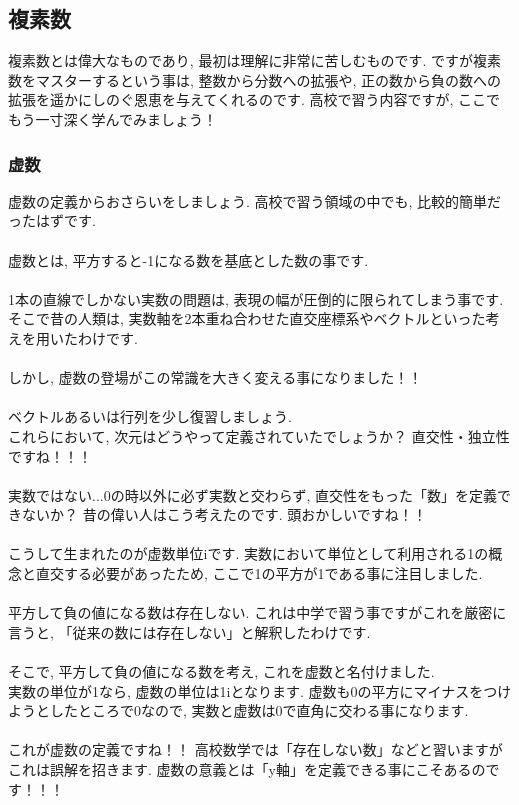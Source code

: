 \documentclass[11pt,a4paper]{jsarticle}
\begin{document}
\subsection{複素数}
複素数とは偉大なものであり, 最初は理解に非常に苦しむものです. ですが複素数をマスターするという事は, 整数から分数への拡張や, 正の数から負の数への拡張を遥かにしのぐ恩恵を与えてくれるのです. 高校で習う内容ですが, ここでもう一寸深く学んでみましょう！\\
\subsubsection{虚数}
虚数の定義からおさらいをしましょう. 高校で習う領域の中でも, 比較的簡単だったはずです.\\
\\
虚数とは, 平方すると-1になる数を基底とした数の事です.\\
\\
1本の直線でしかない実数の問題は, 表現の幅が圧倒的に限られてしまう事です. そこで昔の人類は, 実数軸を2本重ね合わせた直交座標系やベクトルといった考えを用いたわけです.\\
\\
しかし, 虚数の登場がこの常識を大きく変える事になりました！！\\
\\
ベクトルあるいは行列を少し復習しましょう.\\
これらにおいて, 次元はどうやって定義されていたでしょうか？ 直交性・独立性ですね！！！\\
\\
実数ではない...0の時以外に必ず実数と交わらず, 直交性をもった「数」を定義できないか？
昔の偉い人はこう考えたのです. 頭おかしいですね！！\\
\\
こうして生まれたのが虚数単位iです. 実数において単位として利用される1の概念と直交する必要があったため, ここで1の平方が1である事に注目しました. \\
\\
平方して負の値になる数は存在しない. これは中学で習う事ですがこれを厳密に言うと, 「従来の数には存在しない」と解釈したわけです.\\
\\
そこで, 平方して負の値になる数を考え, これを虚数と名付けました.\\
実数の単位が1なら, 虚数の単位は1iとなります. 虚数も0の平方にマイナスをつけようとしたところで0なので, 実数と虚数は0で直角に交わる事になります.\\
\\
これが虚数の定義ですね！！ 高校数学では「存在しない数」などと習いますがこれは誤解を招きます. 虚数の意義とは「y軸」を定義できる事にこそあるのです！！！\\
\end{document}
